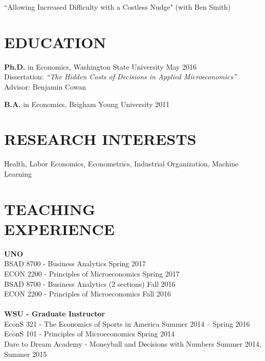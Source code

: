 \documentclass[margin]{res}  %
\begin{document}
\begin{resume}
``Allowing Increased Difficulty with a Costless Nudge" (with Ben Smith)

\section{\textnormal{EDUCATION}} 
\textbf{Ph.D.} in Economics, Washington State University \hfill May 2016 \\
Dissertation: \emph{``The Hidden Costs of Decisions in Applied Microeconomics''}\\
Advisor: Benjamin Cowan

\textbf{B.A.} in Economics, Brigham Young University \hfill 2011

\section{\textnormal{RESEARCH INTERESTS}}
Health, Labor Economics, Econometrics, Industrial Organization, Machine Learning

\section{\textnormal{TEACHING \\EXPERIENCE}}

\textbf{UNO}\\
BSAD 8700 - Business Analytics \hfill Spring 2017\\
ECON 2200 - Principles of Microeconomics \hfill Spring 2017\\
BSAD 8700 - Business Analytics (2 sections) \hfill Fall 2016\\
ECON 2200 - Principles of Microeconomics \hfill Fall 2016\\\\
\textbf{WSU - Graduate Instructor}\\
EconS 321 - The Economics of Sports in America \hfill Summer 2014 -- Spring 2016\\
EconS 101 - Principles of Microeconomics \hfill Spring 2014 \\
Dare to Dream Academy - Moneyball and Decisions with Numbers \hfill Summer 2014, Summer 2015 \\

%



\end{resume}
\end{document}
